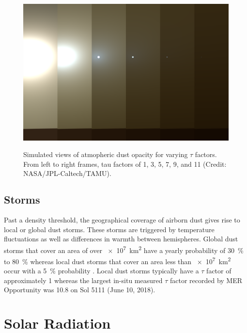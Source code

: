 \begin{figure}[H]
  \centering
  \hypersetup{linkcolor=captionTextColor}
  \includegraphics[width=0.8\linewidth]{sections/martian-environment/images/tau-factors.png}\\
  \caption[Simulated views of atmopheric dust opacity for varying $\tau$ factors]
          {Simulated views of atmopheric dust opacity for varying $\tau$ factors. From left to right frames, tau factors of 1, 3, 5, 7, 9, and 11  (Credit: NASA/JPL-Caltech/TAMU).}
  \label{fig:image:tau-factors}
\end{figure}

\subsection{Storms}
\label{sec:MartianEnvironment:Dust:Storms}

Past a density threshold, the geographical coverage of airborn dust gives rise to local or global dust storms. These storms are triggered by temperature fluctuations as well as differences in warmth between hemispheres. Global dust storms that cover an area of over \SI{e7}{\kilo\meter\squared} have a yearly probability of \SI{30}{\percent} to \SI{80}{\percent} whereas local dust storms that cover an area less than \SI{e7}{\kilo\meter\squared} occur with a \SI{5}{\percent} probability . Local dust storms typically have a $\tau$ factor of approximately 1  whereas the largest in-situ measured $\tau$ factor recorded by MER Opportunity was 10.8 on Sol 5111 (June 10, 2018).

\section{Solar Radiation}
\label{sec:MartianEnvironment:SolarRadiation}

